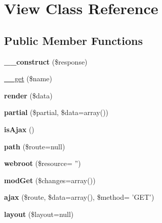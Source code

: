 \hypertarget{classView}{
\section{View Class Reference}
\label{classView}
}
\subsection*{Public Member Functions}
\begin{DoxyCompactItemize}
\item 
\hypertarget{classView_aff2c8a304801730574b5bc109c482e09}{
{\bfseries \_\-\_\-construct} (\$response)}
\label{classView_aff2c8a304801730574b5bc109c482e09}

\item 
\hyperlink{classView_a82676edf021e4e4e89bd6d4876ad7fb9}{\_\-\_\-get} (\$name)
\item 
\hypertarget{classView_a1dab1e88315e34d6f4c74b75ca12f12d}{
{\bfseries render} (\$data)}
\label{classView_a1dab1e88315e34d6f4c74b75ca12f12d}

\item 
\hypertarget{classView_ad28ba2a16ab546f22dd5a60e65f20d2a}{
{\bfseries partial} (\$partial, \$data=array())}
\label{classView_ad28ba2a16ab546f22dd5a60e65f20d2a}

\item 
\hypertarget{classView_a1e38f96f791a0d264ea794ccd1c7c8ee}{
{\bfseries isAjax} ()}
\label{classView_a1e38f96f791a0d264ea794ccd1c7c8ee}

\item 
\hypertarget{classView_ab4e4860b85376521eff6579b1f386715}{
{\bfseries path} (\$route=null)}
\label{classView_ab4e4860b85376521eff6579b1f386715}

\item 
\hypertarget{classView_a604713b6fdc5d37523d60839652fdcd5}{
{\bfseries webroot} (\$resource= '')}
\label{classView_a604713b6fdc5d37523d60839652fdcd5}

\item 
\hypertarget{classView_acb1fea2da6c574abd3954f1c9271d451}{
{\bfseries modGet} (\$changes=array())}
\label{classView_acb1fea2da6c574abd3954f1c9271d451}

\item 
\hypertarget{classView_a3c6dd7873c2b0bb4e4d9e39638c42bb0}{
{\bfseries ajax} (\$route, \$data=array(), \$method= 'GET')}
\label{classView_a3c6dd7873c2b0bb4e4d9e39638c42bb0}

\item 
\hypertarget{classView_a91dbfe549a40feaacb321d64997461fa}{
{\bfseries layout} (\$layout=null)}
\label{classView_a91dbfe549a40feaacb321d64997461fa}

\end{DoxyCompactItemize}
